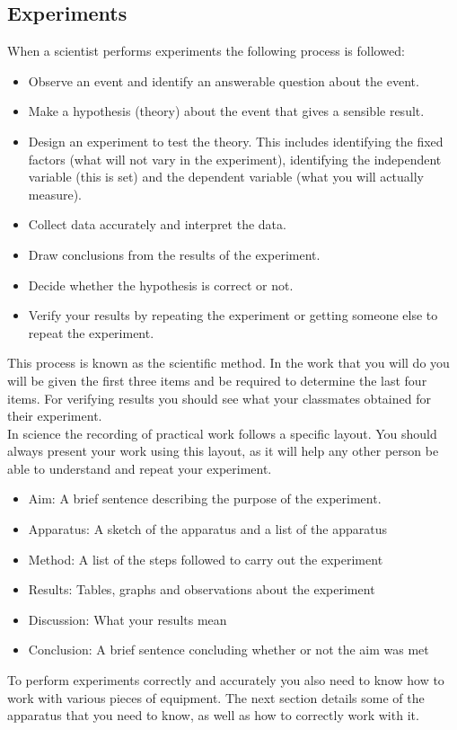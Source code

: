 \begin{enumerate}[label=\textbf{\arabic*}.]
\subsection*{Experiments}
When a scientist performs experiments the following process is followed:
\begin{itemize}
\item Observe an event and identify an answerable question about the event.
\item Make a hypothesis (theory) about the event that gives a sensible result.
\item Design an experiment to test the theory. This includes identifying the fixed factors (what will not vary in the experiment), identifying the independent variable (this is set) and the dependent variable (what you will actually measure).
\item Collect data accurately and interpret the data.
\item Draw conclusions from the results of the experiment.
\item Decide whether the hypothesis is correct or not.
\item Verify your results by repeating the experiment or getting someone else to repeat the experiment.
\end{itemize}
This process is known as the scientific method. In the work that you will do you will be given the first three items and be required to determine the last four items. For verifying results you should see what your classmates obtained for their experiment. \\
In science the recording of practical work follows a specific layout. You should always present your work using this layout, as it will help any other person be able to understand and repeat your experiment.
\begin{itemize}
\item Aim: A brief sentence describing the purpose of the experiment.
\item Apparatus: A sketch of the apparatus and a list of the apparatus
\item Method: A list of the steps followed to carry out the experiment
\item Results: Tables, graphs and observations about the experiment
\item Discussion: What your results mean
\item Conclusion: A brief sentence concluding whether or not the aim was met
\end{itemize}
To perform experiments correctly and accurately you also need to know how to work with various pieces of equipment. The next section details some of the apparatus that you need to know, as well as how to correctly work with it.\\

\end{enumerate}
